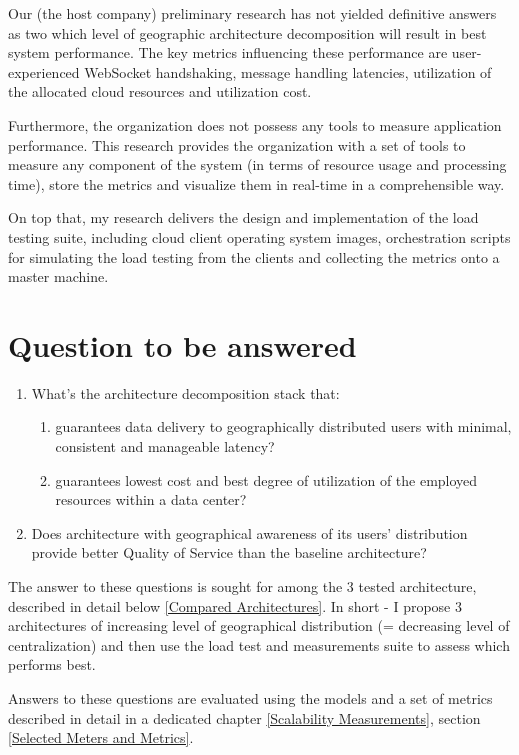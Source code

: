 \documentclass{uvamscse}
\begin{document}
Our (the host company) preliminary research has not yielded definitive answers as two which level of geographic architecture decomposition will result in best system performance. The key metrics influencing these performance are user-experienced WebSocket handshaking, message handling latencies, utilization of the allocated cloud resources and utilization cost.

Furthermore, the organization does not possess any tools to measure application performance. This research provides the organization with a set of tools to measure any component of the system (in terms of resource usage and processing time), store the metrics and visualize them in real-time in a comprehensible way.

On top that, my research delivers the design and implementation of the load testing suite, including cloud client operating system images, orchestration scripts for simulating the load testing from the clients and collecting the metrics onto a master machine.

\section{Question to be answered}
\begin{enumerate}
  \item What's the architecture decomposition stack that:
    \begin{enumerate}
      \item guarantees data delivery to geographically distributed users with minimal, consistent and manageable latency?
      \item guarantees lowest cost and best degree of utilization of the employed resources within a data center?
    \end{enumerate}
  \item Does architecture with geographical awareness of its users' distribution provide better Quality of Service than the baseline architecture?
\end{enumerate}

The answer to these questions is sought for among the 3 tested architecture, described in detail below \ref{Compared Architectures}. In short - I propose 3 architectures of increasing level of geographical distribution (= decreasing level of centralization) and then use the load test and measurements suite to assess which performs best.

Answers to these questions are evaluated using the models and a set of metrics described in detail in a dedicated chapter \ref{Scalability Measurements}, section \ref{Selected Meters and Metrics}.
\end{document}
